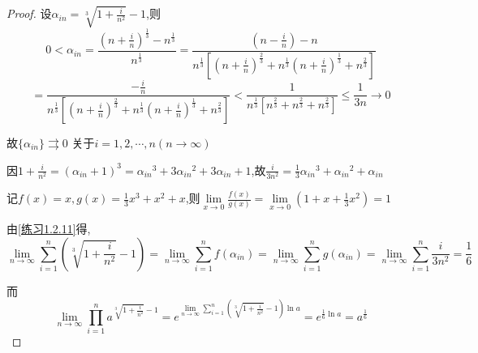 \begin{proof}
    
    设$\alpha_{in}=\sqrt[3]{1+\frac{i}{n^2}}-1$,则
    $$0<\alpha_{in}=\frac{(n+\frac{i}{n})^{\frac{1}{3}}-n^{\frac{1}{3}}}{n^{\frac{1}{3}}}
    =\frac{(n-\frac{i}{n})-n}{n^{\frac{1}{3}}[(n+\frac{i}{n})^{\frac{2}{3}}+n^{\frac{1}{3}}(n+\frac{i}{n})^{\frac{1}{3}}+n^{\frac{2}{3}}]}$$
    \begin{equation}
        =\frac{-\frac{i}{n}}{n^{\frac{1}{3}}[(n+\frac{i}{n})^{\frac{2}{3}}+n^{\frac{1}{3}}(n+\frac{i}{n})^{\frac{1}{3}}+n^{\frac{2}{3}}]}
        < \frac{1}{n^{\frac{1}{3}} [n^{\frac{2}{3}}+n^{\frac{2}{3}}+n^{\frac{2}{3}}]}
        \le \frac{1}{3n} \to 0
    \end{equation}

    故$\{\alpha_{in}\} \rightrightarrows 0$ 关于$i=1,2,\cdots,n(n\to \infty)$

    因$1+\frac{i}{n^2}=(\alpha_{in}+1)^3
    ={\alpha_{in}}^3+3{\alpha_{in}}^2+3\alpha_{in}+1$,故$\frac{i}{3n^2}=\frac{1}{3}{\alpha_{in}}^3+{\alpha_{in}}^2+\alpha_{in}$
    
    记$f(x)=x,g(x)=\frac{1}{3}x^3+x^2+x$,则$\lim \limits_{x\to 0}\frac{f(x)}{g(x)}=\lim \limits_{x \to 0}(1+x+\frac{1}{3}x^2)=1$

    由\cref{练习1.2.11}得,$$\lim \limits_{n \to \infty} \sum\limits_{i=1}^{n} (\sqrt[3]{1+\frac{i}{n^2}}-1)
    =\lim \limits_{n \to \infty} \sum\limits_{i=1}^{n} f(\alpha_{in})
    =\lim \limits_{n \to \infty} \sum\limits_{i=1}^{n} g(\alpha_{in})
    =\lim \limits_{n \to \infty} \sum\limits_{i=1}^{n} \frac{i}{3n^2}=\frac{1}{6}$$ 

    而$$\lim \limits_{n \to \infty} \prod \limits_{i=1}^{n} a^{\sqrt[3]{1+\frac{i}{n^2}}-1}
    =e^{\lim \limits_{n \to \infty} \sum\limits_{i=1}^{n} (\sqrt[3]{1+\frac{i}{n^2}}-1)\ln a}
    =e^{\frac{1}{6}\ln a}=a^{\frac{1}{6}}$$
\end{proof}

